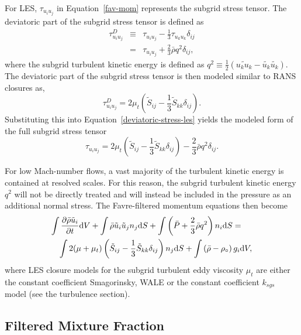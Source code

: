 For LES, $\tau_{u_i u_j}$ in Equation~\ref{fav-mom} represents the 
subgrid stress tensor.  The deviatoric part of the subgrid stress
tensor is defined as
%
\begin{eqnarray}
\tau_{u_i u_j}^D & \equiv & \tau_{u_i u_j} - \frac{1}{3} \tau_{u_k u_k}
                            \delta_{ij} \nonumber \\
    & = & \tau_{u_i u_j} + \frac{2}{3} \bar{\rho} q^2 \delta_{ij},
    \label{deviatoric-stress-les}
\end{eqnarray}
%
where the subgrid turbulent kinetic energy is defined as
$q^2 \equiv \frac{1}{2} (\widetilde{u_k u_k} - \tilde{u_k} \tilde{u_k} )$.
The deviatoric part of the subgrid stress tensor is then modeled similar
to RANS closures as,
%
\begin{equation}
\tau_{u_i u_j}^D = 2 \mu_t \left( \tilde{S}_{ij} - \frac{1}{3} \tilde{S}_{kk}
     \delta_{ij} \right).
\end{equation}
%
Substituting this into Equation~\ref{deviatoric-stress-les} yields the
modeled form of the full subgrid stress tensor
%
\begin{equation}
\tau_{u_i u_j} = 2 \mu_t \left( \tilde{S}_{ij} - \frac{1}{3} \tilde{S}_{kk}
     \delta_{ij} \right) - \frac{2}{3} \bar{\rho} q^2 \delta_{ij}.
\label{mod-stress-les}
\end{equation}

For low Mach-number flows, a vast majority of the turbulent kinetic energy
is contained at resolved scales.
For this reason, the subgrid turbulent kinetic energy $q^2$ will not be
directly treated and will instead be included in the pressure as an
additional normal stress.  The Favre-filtered momentum equations then become
%
\begin{eqnarray}
\lefteqn{ \int {{\partial \bar{\rho} \tilde{u}_i} \over {\partial t}}
     {\rm d}V + \int \bar{\rho} \tilde{u}_i \tilde{u}_j n_j {\rm d}S 
   + \int \left( \bar{P} + \frac{2}{3} \bar{\rho} q^2 \right) 
     n_i {\rm d}S = } \nonumber \\
   && \int 2 (\mu + \mu_t) \left( \tilde{S}_{ij} - \frac{1}{3}
      \tilde{S}_{kk} \delta_{ij} \right) n_j {\rm d}S
    + \int \left(\bar{\rho} - \rho_{\circ} \right) g_i {\rm d}V,
\label{mod-mom-les}
\end{eqnarray}
%
where LES closure models for the subgrid turbulent eddy viscosity
$\mu_t$ are either the constant coefficient Smagorinsky, WALE or the constant 
coefficient $k_{sgs}$ model (see the turbulence section).

\subsection{Filtered Mixture Fraction} \label{sec:filtered_Z}

